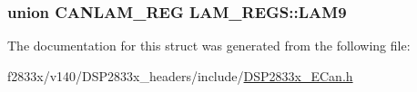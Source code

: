 \subsubsection[{L\+A\+M9}]{\setlength{\rightskip}{0pt plus 5cm}union {\bf C\+A\+N\+L\+A\+M\+\_\+\+R\+E\+G} L\+A\+M\+\_\+\+R\+E\+G\+S\+::\+L\+A\+M9}\label{struct_l_a_m___r_e_g_s_ac9cd380dc7da388a98978c750a673b0a}


The documentation for this struct was generated from the following file\+:\begin{DoxyCompactItemize}
\item 
f2833x/v140/\+D\+S\+P2833x\+\_\+headers/include/\hyperlink{_d_s_p2833x___e_can_8h}{D\+S\+P2833x\+\_\+\+E\+Can.\+h}\end{DoxyCompactItemize}
